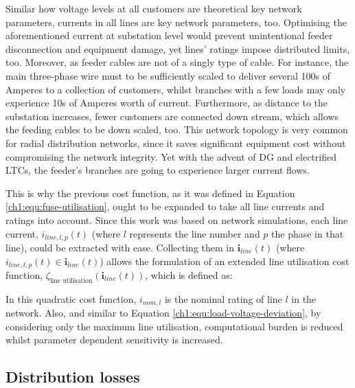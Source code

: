 Similar how voltage levels at all customers are theoretical key network parameters, currents in all lines are key network parameters, too.
Optimising the aforementioned current at substation level would prevent unintentional feeder disconnection and equipment damage, yet lines' ratings impose distributed limits, too.
Moreover, as feeder cables are not of a singly type of cable.
For instance, the main three-phase wire must to be sufficiently scaled to deliver several 100s of Amperes to a collection of customers, whilst branches with a few loads may only experience 10s of Amperes worth of current.
Furthermore, as distance to the substation increases, fewer customers are connected down stream, which allows the feeding cables to be down scaled, too.
This network topology is very common for radial distribution networks, since it saves significant equipment cost without compromising the network integrity.
Yet with the advent of DG and electrified LTCs, the feeder's branches are going to experience larger current flows.

This is why the previous cost function, as it was defined in Equation \ref{ch1:equ:fuse-utilisation}, ought to be expanded to take all line currents and ratings into account.
Since this work was based on network simulations, each line current, $i_{line,l,p}(t)$ (where $l$ represents the line number and $p$ the phase in that line), could be extracted with ease.
Collecting them in $\textbf{i}_{line}(t)$ (where $i_{line,l,p}(t) \in \textbf{i}_{line}(t)$) allows the formulation of an extended line utilisation cost function, $\zeta_\text{line utilisation}(\textbf{i}_{line}(t))$, which is defined as:



In this quadratic cost function, $i_{nom,l}$ is the nominal rating of line $l$ in the network.
Also, and similar to Equation \ref{ch1:equ:load-voltage-deviation}, by considering only the maximum line utilisation, computational burden is reduced whilst parameter dependent sensitivity is increased.

\subsection{Distribution losses}
\label{ch1:subsec:losses}


